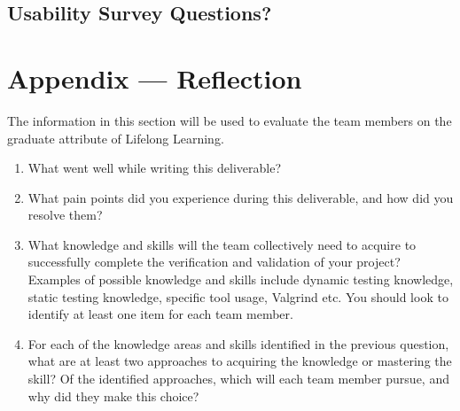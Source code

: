 \documentclass[12pt, titlepage]{article}
\begin{document}
\subsection{Usability Survey Questions?}


\newpage{}
\section*{Appendix --- Reflection}


The information in this section will be used to evaluate the team members on the
graduate attribute of Lifelong Learning.


\begin{enumerate}
  \item What went well while writing this deliverable? 
  \item What pain points did you experience during this deliverable, and how
    did you resolve them?
  \item What knowledge and skills will the team collectively need to acquire to
  successfully complete the verification and validation of your project?
  Examples of possible knowledge and skills include dynamic testing knowledge,
  static testing knowledge, specific tool usage, Valgrind etc.  You should look to
  identify at least one item for each team member.
  \item For each of the knowledge areas and skills identified in the previous
  question, what are at least two approaches to acquiring the knowledge or
  mastering the skill?  Of the identified approaches, which will each team
  member pursue, and why did they make this choice?
\end{enumerate}
\end{document}
